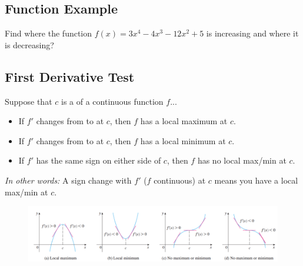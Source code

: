 \documentclass[10pt]{book}
\theoremstyle{definition}
\begin{document}
\subsection*{Function Example} Find where the function $f(x)=3x^4-4x^3-12x^2+5$ is increasing and where it is decreasing?
\clearpage
\begin{tcolorbox}
\subsection*{First Derivative Test}
Suppose that $c$ is a \underline{\hspace{3cm}} of a continuous function $f$...
\begin{itemize}
    \item If $f'$ changes from \underline{\hspace{1cm}} to \underline{\hspace{1cm}} at $c$, then $f$ has a local maximum at $c$.
    \item If $f'$ changes from \underline{\hspace{1cm}} to \underline{\hspace{1cm}} at $c$, then $f$ has a local minimum at $c$.
    \item If $f'$ has the same sign on either side of $c$, then $f$ has no local max/min at $c$. 
\end{itemize}
\textit{In other words:} A sign change with $f'$ ($f$ continuous) at $c$ means you have a local max/min at $c$.
\end{tcolorbox}
\begin{figure}[h!]
    \centering
    \includegraphics{FirstDTest.png}
\end{figure}
\end{document}
